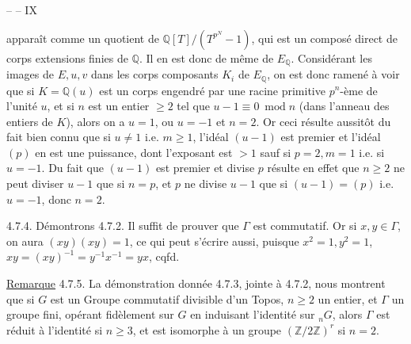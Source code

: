 \hfill --  -- \hfill IX

apparaît comme un quotient de $\mathbb Q[T]/(T^{p^N}-1)$, qui est un composé direct de corps extensions finies de $\mathbb Q$. Il en est donc de même de $E_{\mathbb Q}$. Considérant les images de $E,u,v$ dans les corps composants $K_i$ de $E_{\mathbb Q}$, on est donc ramené à voir que si $K=\mathbb Q(u)$ est un corps engendré par une racine primitive $p^n$-ème de l'unité $u$, et si $n$ est un entier $\geq2$ tel que $u-1\equiv0\ \operatorname{mod}n$ (dans l'anneau des entiers de $K$), alors on a $u=1$, ou $u=-1$ et $n=2$. Or ceci résulte aussitôt du fait bien connu que si $u\neq1$ i.e. $m\geq1$, l'idéal $(u-1)$ est premier et l'idéal $(p)$ en est une puissance, dont l'exposant est $>1$ sauf si $p=2,m=1$ i.e. si $u=-1$. Du fait que $(u-1)$ est premier et divise $p$ résulte en effet que $n\geq2$ ne peut diviser $u-1$ que si $n=p$, et $p$ ne divise $u-1$ que si $(u-1)=(p)$ i.e. $u=-1$, donc $n=2$.

4.7.4. Démontrons 4.7.2. Il suffit de prouver que $\Gamma$ est commutatif. Or si $x,y\in\Gamma$, on aura $(xy)(xy)=1$, ce qui peut s'écrire aussi, puisque $x^2=1,y^2=1$, $xy=(xy)^{-1}=y^{-1}x^{-1}=yx$, cqfd.

\uline{Remarque} 4.7.5. La démonstration donnée 4.7.3, jointe à 4.7.2, nous montrent que si $G$ est un Groupe commutatif divisible d'un Topos, $n\geq2$ un entier, et $\Gamma$ un groupe fini, opérant fidèlement sur $G$ en induisant l'identité sur ${}_nG$, alors $\Gamma$ est réduit à l'identité si $n\geq3$, et est isomorphe à un groupe $(\mathbb Z/2\mathbb Z)^r$ si $n=2$.
